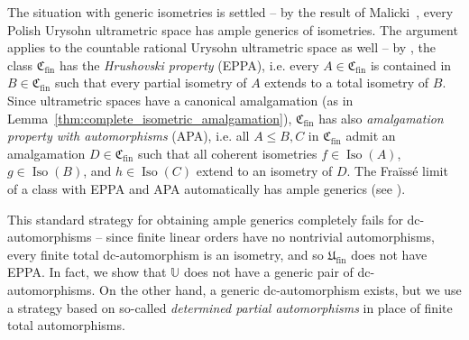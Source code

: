 \documentclass[oneside,notitlepage,12pt]{article}
\theoremstyle{definition}
\theoremstyle{remark}
\newcommand \U {\mathbb{U}}
\newcommand \fin {{\operatorname{fin}}}
\newcommand \Ult {\mathfrak{U}}
\newcommand \Iso {\operatorname{Iso}}
\begin{document}
The situation with generic isometries is settled – by the result of Malicki~\cite[Corollary~6.1]{Mal}, every Polish Urysohn ultrametric space has ample generics of isometries.
The argument applies to the countable rational Urysohn ultrametric space as well – by \cite[Lemma~4.2]{Mal}, the class $\mathfrak{C}_\fin$ has the \emph{Hrushovski property} (EPPA), i.e.  every $A \in \mathfrak{C}_\fin$ is contained in $B \in \mathfrak{C}_\fin$ such that every partial isometry of $A$ extends to a total isometry of $B$.
Since ultrametric spaces have a canonical amalgamation (as in Lemma~\ref{thm:complete_isometric_amalgamation}), $\mathfrak{C}_\fin$ has also \emph{amalgamation property with automorphisms} (APA), i.e. all $A \leq B, C$ in $\mathfrak{C}_\fin$ admit an amalgamation $D \in \mathfrak{C}_\fin$ such that all coherent isometries $f \in \Iso(A)$, $g \in \Iso(B)$, and $h \in \Iso(C)$ extend to an isometry of $D$.
The Fraïssé limit of a class with EPPA and APA automatically has ample generics (see \cite[Theorem~2.1.5]{Siniora}).

This standard strategy for obtaining ample generics completely fails for dc-automorphisms – since finite linear orders have no nontrivial automorphisms, every finite total dc-automorphism is an isometry, and so $\Ult_\fin$ does not have EPPA.
In fact, we show that $\U$ does not have a generic pair of dc-automorphisms.
On the other hand, a generic dc-automorphism exists, but we use a strategy based on so-called \emph{determined partial automorphisms} in place of finite total automorphisms.
\end{document}
